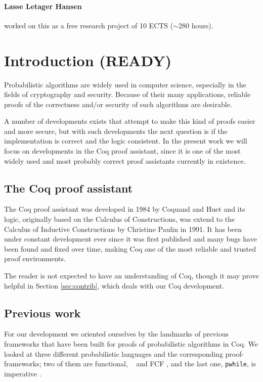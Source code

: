 \documentclass[11pt, leqno, titlepage]{article}
\theoremstyle{definition}
\begin{document}
\paragraph{Lasse Letager Hansen} worked on this as a free research project of 10 ECTS
($\sim$280 hours).



\vspace*{\fill}
\newpage

\tableofcontents
\newpage


\section{Introduction (READY)}
Probabilistic algorithms are widely used in computer science, especially in the
fields of cryptography and security. Because of their many applications, reliable
proofs of the correctness and/or security of such algorithms are desirable. 

A number of developments exists that attempt to make this kind of proofs easier and
more secure, but with such developments the next question is if the implementation is
correct and the logic consistent.  In the present work we will focus on developments
in the Coq proof assistant, since it is one of the most widely used and most probably
correct proof assistants currently in existence.

\subsection{The Coq proof assistant}
The Coq proof assistant was developed in 1984 by Coquand and Huet
\cite{coq-proof-ass} and its logic, originally based on the Calculus of
Constructions, was extend to the Calculus of Inductive Constructions by Christine
Paulin in 1991.  It has been under constant development ever since it was first
published and many bugs have been found and fixed over time, making Coq one of the
most reliable and trusted proof environments.

The reader is not expected to have an understanding of Coq, though it may prove
helpful in Section \ref{sec:contrib}, which deals with our Coq development. 

\subsection{Previous work}
For our development we oriented ourselves by the landmarks of previous frameworks
that have been built for proofs of probabilistic algorithms in Coq. We looked at
three different probabilistic languages and the corresponding proof-frameworks; two
of them are functional, \rml\ \cite{rml-paper} and FCF \cite{fcf}, and the last one,
\texttt{pwhile}, is imperative \cite{easy-crypt}.
\end{document}
